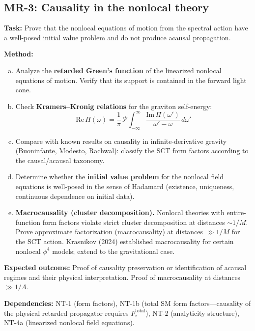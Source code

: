 \documentclass[12pt,a4paper]{article}
\newcommand{\task}[1]{\noindent\textbf{Task:} #1\par}
\newcommand{\method}[1]{\noindent\textbf{Method:} #1\par}
\newcommand{\outcome}[1]{\noindent\textbf{Expected outcome:} #1\par}
\newcommand{\deps}[1]{\noindent\textbf{Dependencies:} #1\par}
\begin{document}
\subsection{MR-3: Causality in the nonlocal theory}
\label{task:MR3}

\task{Prove that the nonlocal equations of motion from the spectral action
have a well-posed initial value problem and do not produce acausal propagation.}

\method{
\begin{enumerate}[(a)]
  \item Analyze the \textbf{retarded Green's function} of the linearized
    nonlocal equations of motion. Verify that its support is contained in
    the forward light cone.
  \item Check \textbf{Kramers--Kronig relations} for the graviton self-energy:
    \begin{equation}
      \text{Re}\,\Pi(\omega) = \frac{1}{\pi}\,\mathcal{P}\!\int_{-\infty}^{\infty}
      \frac{\text{Im}\,\Pi(\omega')}{\omega' - \omega}\,d\omega'
    \end{equation}
  \item Compare with known results on causality in infinite-derivative gravity
    (Buoninfante, Modesto, Rachwal): classify the SCT form factors according
    to the causal/acausal taxonomy.
  \item Determine whether the \textbf{initial value problem} for the nonlocal
    field equations is well-posed in the sense of Hadamard (existence,
    uniqueness, continuous dependence on initial data).
  \item \textbf{Macrocausality (cluster decomposition).} Nonlocal theories
    with entire-function form factors violate strict cluster decomposition
    at distances $\sim 1/M$. Prove approximate factorization
    (macrocausality) at distances $\gg 1/M$ for the SCT action.
    Krasnikov (2024) established macrocausality for certain nonlocal $\phi^4$
    models; extend to the gravitational case.
\end{enumerate}
}

\outcome{Proof of causality preservation or identification of acausal
regimes and their physical interpretation. Proof of macrocausality
at distances $\gg 1/\Lambda$.}

\deps{NT-1 (form factors), NT-1b (total SM form factors---causality of
the physical retarded propagator requires $F_i^{\text{total}}$),
NT-2 (analyticity structure), NT-4a (linearized nonlocal field equations).}
\end{document}
